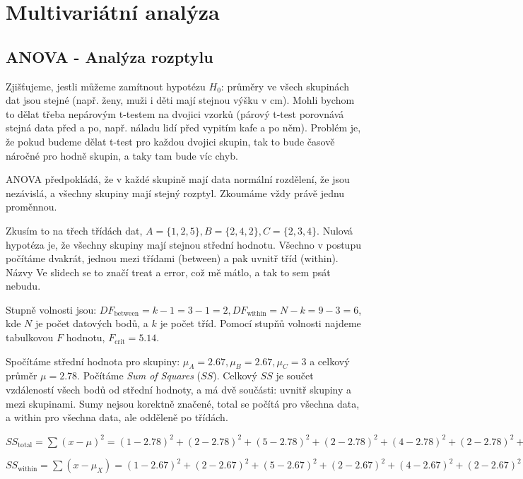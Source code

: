 \documentclass[10pt,a4paper]{article}
\begin{document}
\section{Multivariátní analýza}

\subsection{ANOVA - Analýza rozptylu}

Zjišťujeme, jestli můžeme zamítnout hypotézu $H_0$: průměry ve všech skupinách dat jsou stejné (např. ženy, muži i děti mají stejnou výšku v cm). Mohli bychom to dělat třeba nepárovým t-testem na dvojici vzorků (párový t-test porovnává stejná data před a po, např. náladu lidí před vypitím kafe a po něm). Problém je, že pokud budeme dělat t-test pro každou dvojici skupin, tak to bude časově náročné pro hodně skupin, a taky tam bude víc chyb.

ANOVA předpokládá, že v každé skupině mají data normální rozdělení, že jsou nezávislá, a všechny skupiny mají stejný rozptyl. Zkoumáme vždy právě jednu proměnnou.

Zkusím to na třech třídách dat, $A = \{1, 2, 5\}, B = \{2, 4, 2\}, C = \{2, 3, 4\}$. Nulová hypotéza je, že všechny skupiny mají stejnou střední hodnotu. Všechno v postupu počítáme dvakrát, jednou mezi třídami (between) a pak uvnitř tříd (within). Názvy Ve slidech se to značí treat a error, což mě mátlo, a tak to sem psát nebudu.

Stupně volnosti jsou: $DF_{\text{between}} = k - 1 = 3-1 = 2, DF_{\text{within}} = N - k = 9 - 3 = 6$, kde $N$ je počet datových bodů, a $k$ je počet tříd. Pomocí stupňů volnosti najdeme tabulkovou $F$ hodnotu, $F_{\text{crit}} = 5.14$.

Spočítáme střední hodnota pro skupiny: $\mu_A=2.67,\mu_B=2.67,\mu_C=3$ a celkový průměr $\mu=2.78$. Počítáme \textit{Sum of Squares} ($SS$). Celkový $SS$ je součet vzdáleností všech bodů od střední hodnoty, a má dvě součásti: uvnitř skupiny a mezi skupinami. Sumy nejsou korektně značené, total se počítá pro všechna data, a within pro všechna data, ale odděleně po třídách.

\noindent $SS_\text{total} = \sum (x - \mu)^2 = (1-2.78)^2 + (2-2.78)^2 + (5-2.78)^2 + (2-2.78)^2 + (4-2.78)^2 + (2-2.78)^2 + (2-2.78)^2 + (3-2.78)^2 + (4-2.78)^2  = 13.6$

\noindent $SS_\text{within} = \sum (x - \mu_X) = (1-2.67)^2 + (2-2.67)^2 + (5-2.67)^2 + (2-2.67)^2 + (4-2.67)^2 + (2-2.67)^2 + (2-3)^2 + (3-3)^2 + (3-4)^2 = 13.34$
\end{document}
